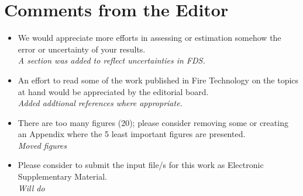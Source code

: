 \documentclass[12pt]{article}
\begin{document}
\section{Comments from the Editor}
\begin{itemize}
\item We would appreciate more efforts in assessing or estimation somehow the error or uncertainty of your results. \\
{\it A section was added to reflect uncertainties in FDS.}
\item An effort to read some of the work published in Fire Technology on the topics at hand would be appreciated by the editorial board. \\
{\it Added addtional references where appropriate.}
\item There are too many figures (20); please consider removing some or creating an Appendix where the 5 least important figures are presented. \\
{\it Moved figures}
\item Please consider to submit the input file/s for this work as Electronic Supplementary Material. \\
{\it Will do}
\end{itemize}
\end{document}
